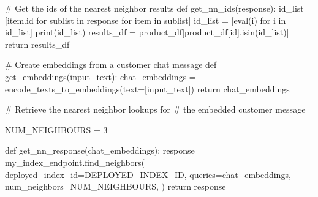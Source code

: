 \documentclass[
  letterpaper,
  DIV=11,
  numbers=noendperiod]{scrreprt}
\newenvironment{Shaded}{\begin{snugshade}}{\end{snugshade}}
\newcommand{\BuiltInTok}[1]{\textcolor[rgb]{0.00,0.23,0.31}{#1}}
\newcommand{\CommentTok}[1]{\textcolor[rgb]{0.37,0.37,0.37}{#1}}
\newcommand{\ControlFlowTok}[1]{\textcolor[rgb]{0.00,0.23,0.31}{#1}}
\newcommand{\DecValTok}[1]{\textcolor[rgb]{0.68,0.00,0.00}{#1}}
\newcommand{\KeywordTok}[1]{\textcolor[rgb]{0.00,0.23,0.31}{#1}}
\newcommand{\NormalTok}[1]{\textcolor[rgb]{0.00,0.23,0.31}{#1}}
\newcommand{\OperatorTok}[1]{\textcolor[rgb]{0.37,0.37,0.37}{#1}}
\newcommand{\StringTok}[1]{\textcolor[rgb]{0.13,0.47,0.30}{#1}}
\begin{document}
\begin{Shaded}
\begin{Highlighting}[]
\CommentTok{\# Get the ids of the nearest neighbor results}
\KeywordTok{def}\NormalTok{ get\_nn\_ids(response):}
\NormalTok{  id\_list }\OperatorTok{=}\NormalTok{ [item.}\BuiltInTok{id} \ControlFlowTok{for}\NormalTok{ sublist }\KeywordTok{in}\NormalTok{ response }\ControlFlowTok{for}\NormalTok{ item }\KeywordTok{in}\NormalTok{ sublist]}
\NormalTok{  id\_list }\OperatorTok{=}\NormalTok{ [}\BuiltInTok{eval}\NormalTok{(i) }\ControlFlowTok{for}\NormalTok{ i }\KeywordTok{in}\NormalTok{ id\_list]}
  \BuiltInTok{print}\NormalTok{(id\_list)}
\NormalTok{  results\_df }\OperatorTok{=}\NormalTok{ product\_df[product\_df[}\StringTok{\textquotesingle{}id\textquotesingle{}}\NormalTok{].isin(id\_list)]}
  \ControlFlowTok{return}\NormalTok{ results\_df}
\end{Highlighting}
\end{Shaded}

\begin{Shaded}
\begin{Highlighting}[]
\CommentTok{\# Create embeddings from a customer chat message}
\KeywordTok{def}\NormalTok{ get\_embeddings(input\_text):}
\NormalTok{  chat\_embeddings }\OperatorTok{=}\NormalTok{ encode\_texts\_to\_embeddings(text}\OperatorTok{=}\NormalTok{[input\_text])}
  \ControlFlowTok{return}\NormalTok{ chat\_embeddings}
\end{Highlighting}
\end{Shaded}

\begin{Shaded}
\begin{Highlighting}[]
\CommentTok{\# Retrieve the nearest neighbor lookups for}
\CommentTok{\# the embedded customer message}

\NormalTok{NUM\_NEIGHBOURS }\OperatorTok{=} \DecValTok{3}

\KeywordTok{def}\NormalTok{ get\_nn\_response(chat\_embeddings):}
\NormalTok{  response }\OperatorTok{=}\NormalTok{ my\_index\_endpoint.find\_neighbors(}
\NormalTok{    deployed\_index\_id}\OperatorTok{=}\NormalTok{DEPLOYED\_INDEX\_ID,}
\NormalTok{    queries}\OperatorTok{=}\NormalTok{chat\_embeddings,}
\NormalTok{    num\_neighbors}\OperatorTok{=}\NormalTok{NUM\_NEIGHBOURS,}
\NormalTok{)}
  \ControlFlowTok{return}\NormalTok{ response}
\end{Highlighting}
\end{Shaded}
\end{document}
